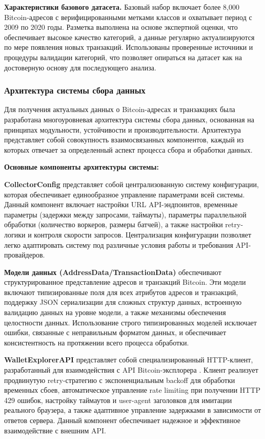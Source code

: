\textbf{Характеристики базового датасета.}
Базовый набор включает более 8{,}000 Bitcoin-адресов с верифицированными метками классов и охватывает период с 2009 по 2020 годы. Разметка выполнена на основе экспертной оценки, что обеспечивает высокое качество категорий, а данные регулярно актуализируются по мере появления новых транзакций. Использованы проверенные источники и процедуры валидации категорий, что позволяет опираться на датасет как на достоверную основу для последующего анализа.

\subsubsection{Архитектура системы сбора данных}

Для получения актуальных данных о Bitcoin-адресах и транзакциях была разработана многоуровневая архитектура системы сбора данных, основанная на принципах модульности, устойчивости и производительности. Архитектура представляет собой совокупность взаимосвязанных компонентов, каждый из которых отвечает за определенный аспект процесса сбора и обработки данных.

\textbf{Основные компоненты архитектуры системы:}

\textbf{CollectorConfig} представляет собой централизованную систему конфигурации, которая обеспечивает единообразное управление параметрами всей системы. Данный компонент включает настройки URL API-эндпоинтов, временные параметры (задержки между запросами, таймауты), параметры параллельной обработки (количество воркеров, размеры батчей), а также настройки retry-логики и контроля скорости запросов. Централизация конфигурации позволяет легко адаптировать систему под различные условия работы и требования API-провайдеров.

\textbf{Модели данных (AddressData/TransactionData)} обеспечивают структурированное представление адресов и транзакций Bitcoin. Эти модели включают типизированные поля для всех атрибутов адресов и транзакций, поддержку JSON сериализации для сложных структур данных, встроенную валидацию данных на уровне модели, а также механизмы обеспечения целостности данных. Использование строго типизированных моделей исключает ошибки, связанные с неправильным форматом данных, и обеспечивает консистентность на протяжении всего процесса обработки.

\textbf{WalletExplorerAPI} представляет собой специализированный HTTP-клиент, разработанный для взаимодействия с API Bitcoin-эксплорера \cite{walletexplorer_api}. Клиент реализует продвинутую retry-стратегию с экспоненциальным backoff для обработки временных сбоев, автоматическое управление rate limiting при получении HTTP 429 ошибок, настройку таймаутов и user-agent заголовков для имитации реального браузера, а также адаптивное управление задержками в зависимости от ответов сервера. Данный компонент обеспечивает надежное и эффективное взаимодействие с внешним API.

